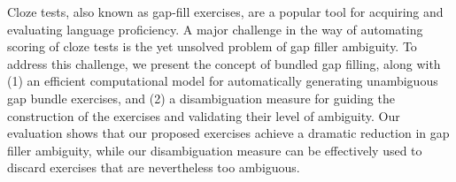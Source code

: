 Cloze tests, also known as gap-fill exercises, are a popular tool for acquiring and evaluating                          language proficiency. A major challenge in the way of automating scoring of cloze tests is the yet unsolved problem of gap filler ambiguity. To address this challenge, we present the concept of bundled gap filling, along with (1) an efficient computational model for automatically generating unambiguous gap bundle exercises, and (2) a disambiguation measure for guiding  the construction of the exercises and validating their level of ambiguity. Our evaluation shows that our proposed exercises achieve a dramatic reduction in gap filler ambiguity, while our disambiguation measure can be effectively used to discard exercises that are nevertheless too ambiguous.
